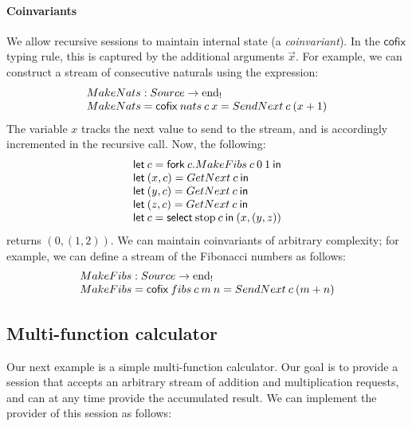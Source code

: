 \documentclass[orivec,envcountsame]{llncs}
\makeatletter
\newcommand{\uto}{\ensuremath{\rightarrow}}
\newcommand{\outterm}{\mathrm{end}_!}
\newcommand{\mkwd}[1]{\mathsf{#1}}
\newcommand{\clabel}[1]{\mathrm{#1}}
\newcommand{\gvselect}[2]{\mkwd{select}\:#1\:#2}
\newcommand{\gvfork}[2]{\mkwd{fork}\:#1.#2}
\newcommand{\lrkwd}{\mkwd{cofix}}
\newcommand{\gvfix}[3]{\lrkwd\:#1\:#2 = #3}
\newcommand{\key}{\mkwd}
\newcommand{\cofix}{\lrkwd}
\newcommand{\ba}{\begin{array}}
\newcommand{\ea}{\end{array}}
\newcommand{\bl}{\ba[t]{@{}l@{}}}
\newcommand{\el}{\ea}
\makeatother
\begin{document}
\paragraph{Coinvariants}

We allow recursive sessions to maintain internal state (a \emph{coinvariant}). In the $\cofix$
typing rule, this is captured by the additional arguments $\vec{x}$. For example, we can construct a
stream of consecutive naturals using the expression:
\[
\bl
  MakeNats : Source \uto \outterm \\
  MakeNats = \gvfix{nats}{c\:x}{SendNext\:c\:(x + 1)} \\
\el
\]
The variable $x$ tracks the next value to send to the stream, and is accordingly incremented in the
recursive call. Now, the following:
\[
\bl
\key{let}\:c = \gvfork{c}{MakeFibs\:c\:0\:1}\:\key{in} \\
\key{let}\:(x, c) = GetNext\:c\:\key{in} \\
\key{let}\:(y, c) = GetNext\:c\:\key{in} \\
\key{let}\:(z, c) = GetNext\:c\:\key{in} \\
\key{let}\:c = \gvselect{\clabel{stop}}{c}\:\key{in}\:(x,(y,z)) \\
\el
\]
returns $(0, (1, 2))$.
%
We can maintain coinvariants of arbitrary complexity; for example, we can define a
stream of the Fibonacci numbers as follows:
\[
\bl
  MakeFibs : Source \uto \outterm \\
  MakeFibs = \gvfix{fibs}{c\:m\:n}{SendNext\:c\:(m + n)} \\
\el
\]

\subsection{Multi-function calculator}

Our next example is a simple multi-function calculator. Our goal is to provide a session that
accepts an arbitrary stream of addition and multiplication requests, and can at any time provide the
accumulated result.  We can implement the provider of this session as follows:

\newcommand{\mcl}[2]{\multicolumn{#1}{l}{#2}}
\end{document}
